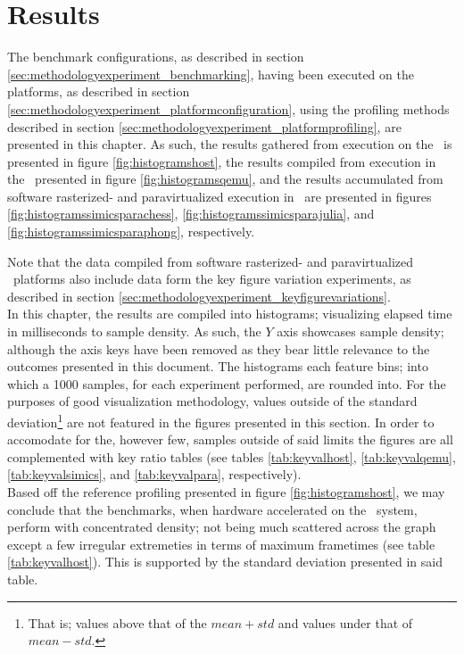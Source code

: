 
\chapter{Results}
\label{cha:results}
The benchmark configurations, as described in section \ref{sec:methodologyexperiment_benchmarking}, having been executed on the platforms, as described in section \ref{sec:methodologyexperiment_platformconfiguration}, using the profiling methods described in section \ref{sec:methodologyexperiment_platformprofiling}, are presented in this chapter.
As such, the results gathered from execution on the \dvttermhost\ is presented in figure \ref{fig:histogramshost}, the results compiled from execution in the \dvttermandroidemulator\ presented in figure \ref{fig:histogramsqemu}, and the results accumulated from software rasterized- and paravirtualized execution in \dvttermsimics\ are presented in figures \ref{fig:histogramssimicsparachess}, \ref{fig:histogramssimicsparajulia}, and \ref{fig:histogramssimicsparaphong}, respectively.

Note that the data compiled from software rasterized- and paravirtualized \dvttermsimics\ platforms also include data form the key figure variation experiments, as described in section \ref{sec:methodologyexperiment_keyfigurevariations}.\\

\noindent
In this chapter, the results are compiled into histograms; visualizing elapsed time in milliseconds to sample density.
As such, the $Y$ axis showcases sample density; although the axis keys have been removed as they bear little relevance to the outcomes presented in this document.
The histograms each feature  bins; into which a 1000 samples, for each experiment performed, are rounded into.
For the purposes of good visualization methodology, values outside of the standard deviation\footnote{That is; values above that of the $mean + std$ and values under that of $mean - std$.} are not featured in the figures presented in this section.
In order to accomodate for the, however few, samples outside of said limits the figures are all complemented with key ratio tables (see tables \ref{tab:keyvalhost}, \ref{tab:keyvalqemu}, \ref{tab:keyvalsimics}, and \ref{tab:keyvalpara}, respectively).\\

\noindent
Based off the reference profiling presented in figure \ref{fig:histogramshost}, we may conclude that the benchmarks, when hardware accelerated on the \dvttermhost\ system, perform with concentrated density; not being much scattered across the graph except a few irregular extremeties in terms of maximum frametimes (see table \ref{tab:keyvalhost}).
This is supported by the standard deviation presented in said table.

